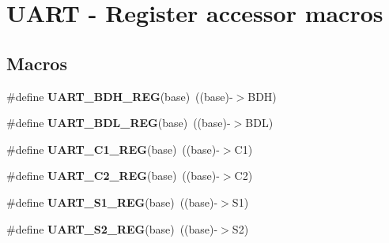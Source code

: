 \hypertarget{group___u_a_r_t___register___accessor___macros}{}\section{U\+A\+RT -\/ Register accessor macros}
\label{group___u_a_r_t___register___accessor___macros}
\subsection*{Macros}
\begin{DoxyCompactItemize}
\item 
\mbox{\label{group___u_a_r_t___register___accessor___macros_ga87a103f3d6a0d05f6b0c909cfeb7a4d9}} 
\#define {\bfseries U\+A\+R\+T\+\_\+\+B\+D\+H\+\_\+\+R\+EG}(base)~((base)-\/$>$B\+DH)
\item 
\mbox{\label{group___u_a_r_t___register___accessor___macros_ga76a25b51a88219d40b957fed02d5e196}} 
\#define {\bfseries U\+A\+R\+T\+\_\+\+B\+D\+L\+\_\+\+R\+EG}(base)~((base)-\/$>$B\+DL)
\item 
\mbox{\label{group___u_a_r_t___register___accessor___macros_ga10f9aabe3d0f670422c5342bebc3f3e2}} 
\#define {\bfseries U\+A\+R\+T\+\_\+\+C1\+\_\+\+R\+EG}(base)~((base)-\/$>$C1)
\item 
\mbox{\label{group___u_a_r_t___register___accessor___macros_ga3ef76a47d3674e17ffcbf0bfb4ac2680}} 
\#define {\bfseries U\+A\+R\+T\+\_\+\+C2\+\_\+\+R\+EG}(base)~((base)-\/$>$C2)
\item 
\mbox{\label{group___u_a_r_t___register___accessor___macros_ga5ff0eec7fa7a282423d94fc39f143624}} 
\#define {\bfseries U\+A\+R\+T\+\_\+\+S1\+\_\+\+R\+EG}(base)~((base)-\/$>$S1)
\item 
\mbox{\label{group___u_a_r_t___register___accessor___macros_ga0e7d1c8dce2636260ce4ca1c63d622db}} 
\#define {\bfseries U\+A\+R\+T\+\_\+\+S2\+\_\+\+R\+EG}(base)~((base)-\/$>$S2)
\item 

\end{DoxyCompactItemize}

